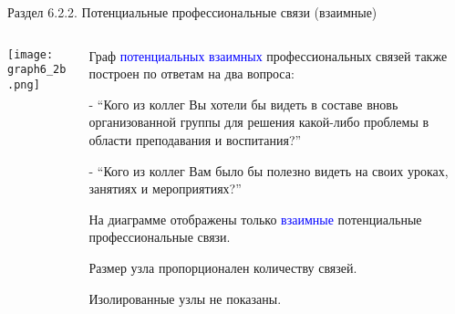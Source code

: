 \begin{frame}{Раздел 6.2.2. Потенциальные профессиональные связи (взаимные)}

\begin{columns} 
\begin{column}{0.75\textwidth}
\centering
          \texttt{[image: graph6\_2b.png]}
\end{column}
\begin{column}{0.25\textwidth} 

\tiny
Граф \textcolor{blue}{потенциальных взаимных} профессиональных связей также построен по ответам на два вопроса:
\smallskip

- ``Кого из коллег Вы хотели бы видеть в составе вновь организованной группы для решения какой-либо проблемы в области преподавания и воспитания?''
\smallskip

- ``Кого из коллег Вам было бы полезно видеть на своих уроках, занятиях и мероприятиях?''
\smallskip

На диаграмме отображены только \textcolor{blue}{взаимные} потенциальные профессиональные связи.
\smallskip

Размер узла пропорционален количеству связей.
\smallskip

Изолированные узлы не показаны.

\end{column}
\end{columns}
\end{frame}


